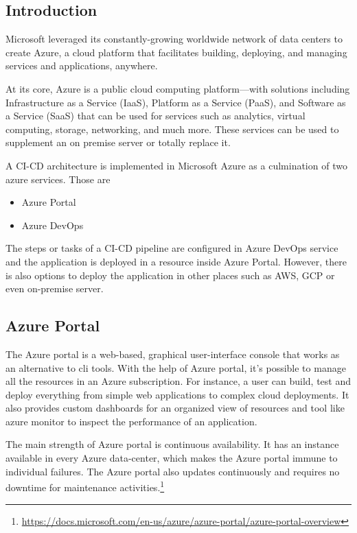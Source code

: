 \subsection{Introduction}
%
Microsoft leveraged its constantly-growing worldwide network of data centers to create Azure, a cloud platform that facilitates building, deploying, and managing services and applications, anywhere. 

At its core, Azure is a public cloud computing platform—with solutions including Infrastructure as a Service (IaaS), Platform as a Service (PaaS), and Software as a Service (SaaS) that can be used for services such as analytics, virtual computing, storage, networking, and much more. These services can be used to supplement an on premise server or totally replace it.

A CI-CD architecture is implemented in Microsoft Azure as a culmination of two azure services. Those are 

\begin{itemize}
    \item Azure Portal
    \item Azure DevOps
\end{itemize}

The steps or tasks of a CI-CD pipeline are configured in Azure DevOps service and the application is deployed in a resource inside Azure Portal. However, there is also options to deploy the application in other places such as AWS, GCP or even on-premise server. 
%

\subsection{Azure Portal}
%
The Azure portal is a web-based, graphical user-interface console that works as an alternative to cli tools. With the help of Azure portal, it's possible to manage all the resources in an Azure subscription. For instance, a user can build, test and deploy everything from simple web applications to complex cloud deployments. It also provides custom dashboards for an organized view of resources and tool like azure monitor to inspect the performance of an application.

The main strength of Azure portal is continuous availability. It has an instance available in every Azure data-center, which makes the Azure portal immune to individual failures. The Azure portal also updates continuously and requires no downtime for maintenance activities.\footnote{\url{https://docs.microsoft.com/en-us/azure/azure-portal/azure-portal-overview}}
%


